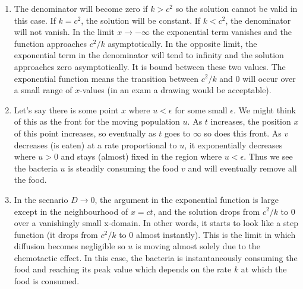 \documentclass[a4paper, 12pt]{article}
\begin{document}
\begin{enumerate}[label={\bf \arabic{*}.\;}, ref={\arabic{*}},itemsep=3ex, left=0ex]
{\begin{enumerate}[label=(\alph*)]
{\begin{align}
              & = \frac{k}{c^2}\left[-\log(u) + \log\left(u-\frac{c^2}{k}\right)\right] \\
              & = \frac{k}{c^2}\log\left(\frac{u-\frac{c^2}{k}}{u}\right).
            \end{align}
            Therefore
            \begin{equation}
              \frac{D}{c}\log\left(\frac{u-\frac{c^2}{k}}{u}\right) = z+A_2\implies\frac{u-\frac{c^2}{k}}{u} =  B\e ^{c z/D}
            \end{equation}
            and
            \begin{equation}
              u =\frac{c^2}{k}\frac{1}{1-B\e ^{cz/D}}.
            \end{equation}
            Applying $u(0)=1$, we have
            \begin{equation}
              \label{ueq}
              u(z) = \frac{c^2}{k-(k-c^2)\e ^{cz/D}},
            \end{equation}
            and substituting $z= x-ct$ gives the required result.
          }

        \item{The denominator will become zero if $k>c^2$ so the solution cannot be valid in this case.  If $k=c^2$, the solution will be constant. If  $k<c^2$, the denominator will not vanish.  In the limit $x\to -\infty$ the exponential term vanishes and the function approaches $c^2/k$ asymptotically. In the opposite limit, the exponential term in the denominator will tend to infinity and the solution approaches zero asymptotically. It is bound between these two values. The exponential function means the transition between $c^2/k$ and $0$ will occur over a small range of $x$-values (in an exam a drawing would be acceptable).
          }
        \item{Let's say there is some point $x$ where $u<\epsilon$ for some small $\epsilon$. We might think of this as the front for the moving population $u$. As $t$ increases, the position $x$ of this point increases, so eventually as $t$ goes to $\infty$ so does this front. As $v$ decreases (is eaten) at a rate proportional to $u$, it exponentially decreases where $u>0$ and stays (almost) fixed in the region where $u<\epsilon$. Thus we see the bacteria $u$ is steadily consuming the food $v$ and will eventually remove all the food.
          }

        \item{In the scenario $D\to 0$, the argument in the exponential function is large except in the neighbourhood of $x = ct$, and the solution drops from $c^2/k$ to $0$ over a vanishingly small x-domain. In other words, it starts to look like a step function (it drops from $c^2/k$ to $0$ almost instantly). This is the limit in which diffusion becomes negligible so $u$ is moving almost solely due to the chemotactic effect. In this case, the bacteria is instantaneously consuming the food and reaching its peak value which depends on the rate $k$ at which the food is consumed.
          }
      \end{enumerate}

}
\end{enumerate}
\end{document}
